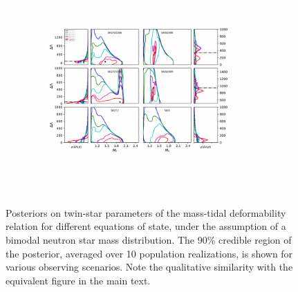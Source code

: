 \documentclass[aps,prl,twocolumn,superscriptaddress,footinbib]{revtex4-1}
\begin{document}
\begin{figure}
    \centering
    \includegraphics[width=0.9\textwidth,trim={145 160 130 70},clip]{bimod-moneyplot.pdf}
    \caption{Posteriors on twin-star parameters of the mass-tidal deformability relation for different equations of state, under the assumption of a bimodal neutron star mass distribution. The 90\% credible region of the posterior, averaged over 10 population realizations, is shown for various observing scenarios. Note the qualitative similarity with the equivalent figure in the main text.}
    \label{fig:bimod_results}
\end{figure}



\end{document}
